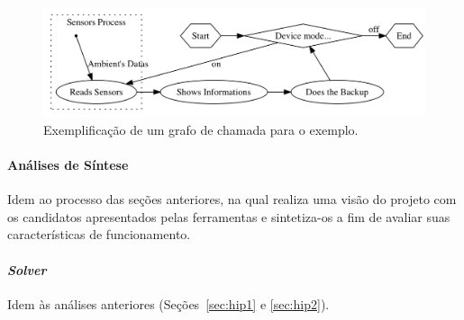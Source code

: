          \begin{figure}[h] \centering
            \includegraphics[width=1\textwidth]{img/graph_wearable3.png}
            \caption{Exemplificação de um grafo de chamada para o exemplo.}
            \label{fig:graph_w3_b}
         \end{figure}
         

      \paragraph{Análises de Síntese}
         Idem ao processo das seções anteriores, na qual realiza uma visão do projeto com os candidatos apresentados pelas ferramentas e sintetiza-os a fim de avaliar suas características de funcionamento.
         
      \paragraph{\textit{Solver}}
         Idem às análises anteriores (Seções~\ref{sec:hip1} e \ref{sec:hip2}).

   
   
   
   
   
   
   
   
   
   